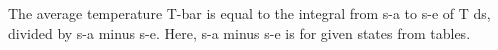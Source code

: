 The average temperature T-bar is equal to the integral from s-a to s-e of T ds, divided by s-a minus s-e. Here, s-a minus s-e is for given states from tables.
